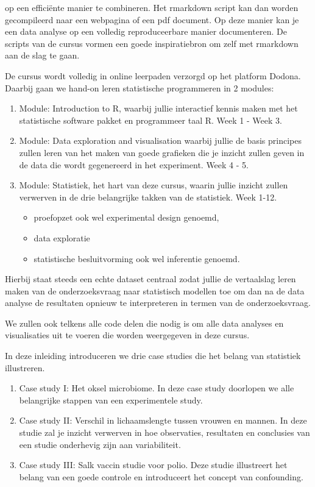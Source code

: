 \documentclass[
  12pt,dutch]{book}
\providecommand{\tightlist}{%
  \setlength{\itemsep}{0pt}\setlength{\parskip}{0pt}}
\theoremstyle{definition}
\theoremstyle{definition}
\theoremstyle{definition}
\theoremstyle{definition}
\theoremstyle{remark}
\begin{document}
op een efficiënte manier te combineren. Het rmarkdown script kan dan worden gecompileerd naar een webpagina of een pdf document. Op deze manier kan je een data analyse op een volledig reproduceerbare manier documenteren. De scripts van de cursus vormen een goede inspiratiebron om zelf met rmarkdown aan de slag te gaan.

De cursus wordt volledig in online leerpaden verzorgd op het platform Dodona.
Daarbij gaan we hand-on leren statistische programmeren in 2 modules:

\begin{enumerate}
\def\labelenumi{\arabic{enumi}.}
\item
  Module: Introduction to R, waarbij jullie interactief kennis maken met het statistische software pakket en programmeer taal R. Week 1 - Week 3.
\item
  Module: Data exploration and visualisation waarbij jullie de basis principes zullen leren van het maken van goede grafieken die je inzicht zullen geven in de data die wordt gegenereerd in het experiment. Week 4 - 5.
\item
  Module: Statistiek, het hart van deze cursus, waarin jullie inzicht zullen verwerven in de drie belangrijke takken van de statistiek. Week 1-12.

  \begin{itemize}
  \tightlist
  \item
    proefopzet ook wel experimental design genoemd,
  \item
    data exploratie
  \item
    statistische besluitvorming ook wel inferentie genoemd.
  \end{itemize}
\end{enumerate}

Hierbij staat steeds een echte dataset centraal zodat jullie de vertaalslag leren maken van de onderzoeksvraag naar statistisch modellen toe om dan na de data analyse de resultaten opnieuw te interpreteren in termen van de onderzoeksvraag.

We zullen ook telkens alle code delen die nodig is om alle data analyses en visualisaties uit te voeren die worden weergegeven in deze cursus.

In deze inleiding introduceren we drie case studies die het belang van statistiek illustreren.

\begin{enumerate}
\def\labelenumi{\arabic{enumi}.}
\item
  Case study I: Het oksel microbiome. In deze case study doorlopen we alle belangrijke stappen van een experimentele study.
\item
  Case study II: Verschil in lichaamslengte tussen vrouwen en mannen. In deze studie zal je inzicht verwerven in hoe observaties, resultaten en conclusies van een studie onderhevig zijn aan variabiliteit.
\item
  Case study III: Salk vaccin studie voor polio. Deze studie illustreert het belang van een goede controle en introduceert het concept van confounding.
\end{enumerate}
\end{document}
